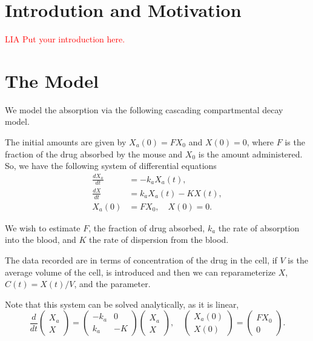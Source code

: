 \documentclass{article}
\begin{document}
\section{Introdution and Motivation}
\textcolor{red}{\Large LIA Put your introduction here.}

\section{The Model}
We model the absorption via the following cascading compartmental decay model.

\begin{center}
\usetikzlibrary{positioning,fit}
\end{center}

The initial amounts are given by $X_a(0) = F X_0$ and $X(0) = 0$, where $F$ is the fraction of the drug absorbed by the mouse and $X_0$ is the amount administered.  So, we have the following system of differential equations
  \begin{align*}
    \frac{dX_a}{dt} &= -k_a X_a(t),\\
    \frac{dX}{dt}   &= k_a X_a(t) - KX(t),\\
     X_a(0) &= F X_0 , \quad X(0) = 0.
  \end{align*}

We wish to estimate $F$, the fraction of drug absorbed, $k_a$ the rate of absorption into the blood, and $K$ the rate of dispersion from the blood.

The data recorded are in terms of concentration of the drug in the cell, if $V$ is the average volume of the cell, is introduced and then we can reparameterize $X$, $C(t) = X(t) / V$, and the parameter. 

Note that this system can be solved analytically, as it is linear,
$$
  \frac{d}{dt}
  \begin{pmatrix}
  X_a \\
  X
  \end{pmatrix}
  =
  \begin{pmatrix}
    -k_a & 0 \\
    k_a  & -K
  \end{pmatrix}
  \begin{pmatrix}
  X_a\\
  X
  \end{pmatrix}, \quad \begin{pmatrix} X_a(0) \\ X(0) \end{pmatrix} = \begin{pmatrix} FX_0 \\ 0\end{pmatrix}.
$$ 
\end{document}
